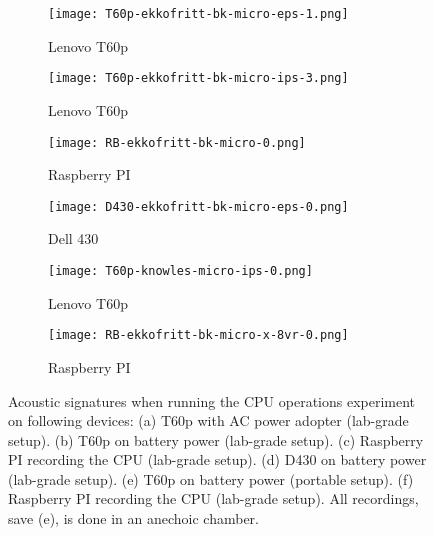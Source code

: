 \begin{figure}[ht]
    \centering
    \begin{subfigure}{0.32\textwidth}
        \centering
        \texttt{[image: T60p-ekkofritt-bk-micro-eps-1.png]}
        \caption{Lenovo T60p}
        \label{fig:comparison_T60p-ekkofritt-bk-micro-eps-1}
    \end{subfigure}
    \begin{subfigure}{0.32\textwidth}
        \centering
        \texttt{[image: T60p-ekkofritt-bk-micro-ips-3.png]}
        \caption{Lenovo T60p}
        \label{fig:comparison_T60p-ekkofritt-bk-micro-ips-3}
    \end{subfigure}
    \begin{subfigure}{0.32\textwidth}
        \centering
        \texttt{[image: RB-ekkofritt-bk-micro-0.png]}
        \caption{Raspberry PI}
        \label{fig:comparison_RB-ekkofritt-bk-micro-0}
    \end{subfigure}
    \begin{subfigure}{0.32\textwidth}
        \centering
        \texttt{[image: D430-ekkofritt-bk-micro-eps-0.png]}
        \caption{Dell 430}
        \label{fig:comparison_D430-ekkofritt-bk-micro-eps-0}
    \end{subfigure}
    \begin{subfigure}{0.32\textwidth}
        \centering
        \texttt{[image: T60p-knowles-micro-ips-0.png]}
        \caption{Lenovo T60p}
        \label{fig:comparison_T60p-knowles-micro-ips-0}
    \end{subfigure}
    \begin{subfigure}{0.32\textwidth}
        \centering
        \texttt{[image: RB-ekkofritt-bk-micro-x-8vr-0.png]}
        \caption{Raspberry PI}
        \label{fig:comparison_RB-ekkofritt-bk-micro-x-8vr-0}
    \end{subfigure}
    \caption{ Acoustic signatures when running the CPU operations experiment on following devices:
    (a) T60p with \gls{AC} power adopter (lab-grade setup).
    (b) T60p on battery power (lab-grade setup).
    (c) Raspberry PI recording the CPU (lab-grade setup).
    (d) D430 on battery power (lab-grade setup).
    (e) T60p on battery power (portable setup).
    (f) Raspberry PI recording the CPU (lab-grade setup).
    All recordings, save (e), is done in an anechoic chamber.}
    \label{fig:comparison_micorinstructions}
\end{figure}


